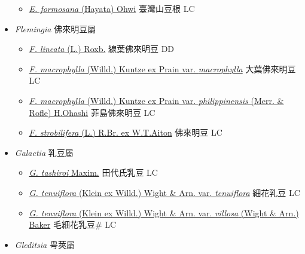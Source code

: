 \begin{itemize}
  \begin{itemize}
        \item[] \href{http://www.theplantlist.org/tpl1.1/search?q=Euchresta+formosana}{\textit{E. formosana} (Hayata) Ohwi}   臺灣山豆根 LC
  \end{itemize}
 \item[] \textit{Flemingia} 佛來明豆屬
                    
  \begin{itemize}
        \item[] \href{http://www.theplantlist.org/tpl1.1/search?q=Flemingia+lineata}{\textit{F. lineata} (L.) Roxb.}   線葉佛來明豆 DD
        \item[] \href{http://www.theplantlist.org/tpl1.1/search?q=Flemingia+macrophylla+var.+macrophylla}{\textit{F. macrophylla} (Willd.) Kuntze ex Prain var. \textit{macrophylla}}   大葉佛來明豆 LC
        \item[] \href{http://www.theplantlist.org/tpl1.1/search?q=Flemingia+macrophylla+var.+philippinensis}{\textit{F. macrophylla} (Willd.) Kuntze ex Prain var. \textit{philippinensis} (Merr. \& Rofle) H.Ohashi}   菲島佛來明豆 LC
        \item[] \href{http://www.theplantlist.org/tpl1.1/search?q=Flemingia+strobilifera}{\textit{F. strobilifera} (L.) R.Br. ex W.T.Aiton}   佛來明豆 LC
  \end{itemize}
 \item[] \textit{Galactia} 乳豆屬
                    
  \begin{itemize}
        \item[] \href{http://www.theplantlist.org/tpl1.1/search?q=Galactia+tashiroi}{\textit{G. tashiroi} Maxim.}   田代氏乳豆 LC
        \item[] \href{http://www.theplantlist.org/tpl1.1/search?q=Galactia+tenuiflora+var.+tenuiflora}{\textit{G. tenuiflora} (Klein ex Willd.) Wight \& Arn. var. \textit{tenuiflora}}   細花乳豆 LC
        \item[] \href{http://www.theplantlist.org/tpl1.1/search?q=Galactia+tenuiflora+var.+villosa}{\textit{G. tenuiflora} (Klein ex Willd.) Wight \& Arn. var. \textit{villosa} (Wight \& Arn.) Baker}   毛細花乳豆\# LC
  \end{itemize}
 \item[] \textit{Gleditsia} 甹莢屬
                    

\end{itemize}
